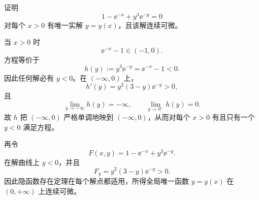 \begin{xreferenceproblem}[20.5.2 第一组参考题 4]
证明
\[
  1-\ee^{-x}+y^3\ee^{-y}=0
\]
对每个 $x>0$ 有唯一实解 $y=y(x)$，且该解连续可微。
\end{xreferenceproblem}
\begin{xsolution}
当 $x>0$ 时
\[
  \ee^{-x}-1\in(-1,0).
\]
方程等价于
\[
  h(y):=y^3\ee^{-y}=\ee^{-x}-1<0.
\]
因此任何解必有 $y<0$。在 $(-\infty,0)$ 上，
\[
  h'(y)=y^2(3-y)\ee^{-y}>0,
\]
且
\[
  \lim_{y\to-\infty}h(y)=-\infty,
  \qquad
  \lim_{y\to0^-}h(y)=0.
\]
故 $h$ 把 $(-\infty,0)$ 严格单调地映到 $(-\infty,0)$，从而对每个 $x>0$ 有且只有一个 $y<0$ 满足方程。

再令
\[
  F(x,y)=1-\ee^{-x}+y^3\ee^{-y}.
\]
在解曲线上 $y<0$，并且
\[
  F_y=y^2(3-y)\ee^{-y}>0.
\]
因此隐函数存在定理在每个解点都适用，所得全局唯一函数 $y=y(x)$ 在 $(0,+\infty)$ 上连续可微。
\end{xsolution}

